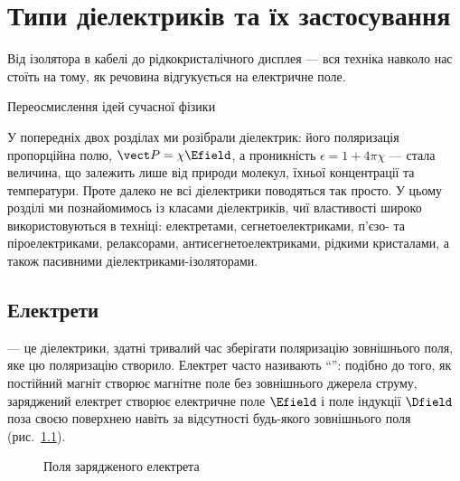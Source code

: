 
\chapter{Типи діелектриків та їх застосування}\label{\currfilebase-III}
\graphicspath{{\currfilebase/Pictures}}
\epigraph{Від ізолятора в кабелі до рідкокристалічного дисплея --- вся техніка навколо нас стоїть на тому, як речовина відгукується на електричне поле.
}{Переосмислення ідей сучасної фізики}

У попередніх двох розділах ми розібрали  діелектрик: його поляризація пропорційна полю, $\vect P = \chi\Efield$, а проникність
$\epsilon = 1 + 4\pi\chi$ --- стала величина, що залежить лише від природи молекул, їхньої концентрації та температури. Проте далеко не всі
діелектрики поводяться так просто. У цьому розділі ми познайомимось із  класами діелектриків, чиї властивості широко
використовуються в техніці: електретами, сегнетоелектриками, п'єзо- та піроелектриками, релаксорами, антисегнетоелектриками, рідкими кристалами, а
також пасивними діелектриками-ізоляторами.

\section{Електрети}

 --- це діелектрики, здатні тривалий час зберігати поляризацію  зовнішнього поля, яке цю поляризацію створило.
Електрет часто називають \enquote{}: подібно до того, як постійний магніт створює магнітне поле без
зовнішнього джерела струму, заряджений електрет створює електричне поле $\Efield$ і поле індукції $\Dfield$ поза своєю поверхнею навіть за
відсутності будь-якого зовнішнього поля (рис.~\ref{pic:Electret}).

\begin{figure}[h!]\centering
	\caption{Поля зарядженого електрета\label{pic:Electret}}
\end{figure}

